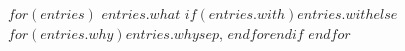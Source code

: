 \begin{cvskills}
$for(entries)$
  \cvskill
    {$entries.what$} %
    {$if(entries.with)$$entries.with$$else$$for(entries.why)$$entries.why$$sep$, $endfor$$endif$} %
$endfor$
\end{cvskills}
